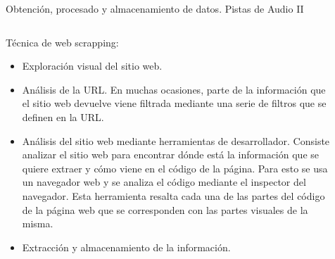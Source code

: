 \begin{frame}[t]{Obtención, procesado y almacenamiento de datos. Pistas de Audio II}
	\begin{table} [h!]
		\centering
	\end{table}
	\begin{columns}
		\begin{column}{0.5\textwidth}
			Técnica de web scrapping:
			\begin{itemize}
				\item Exploración visual del sitio web.
				\item Análisis de la URL. En muchas ocasiones, parte de la información que el sitio web devuelve viene filtrada mediante una serie de filtros que se definen en la URL.
				\item Análisis del sitio web mediante herramientas de desarrollador. Consiste analizar el sitio web para encontrar dónde está la información que se quiere extraer y cómo viene en el código de la página. Para esto se usa un navegador web y se analiza el código mediante el inspector del navegador. Esta herramienta resalta cada una de las partes del código de la página web que se corresponden con las partes visuales de la misma.
				\item Extracción y almacenamiento de la información.
			\end{itemize}
		\end{column}
		\vrule{}
		\begin{column}[t]{0.5\textwidth}
			\vspace*{-100pt}
			\begin{figure}[ht!]
				\centering
\end{figure}
\end{column}
\end{columns}
\end{frame}
